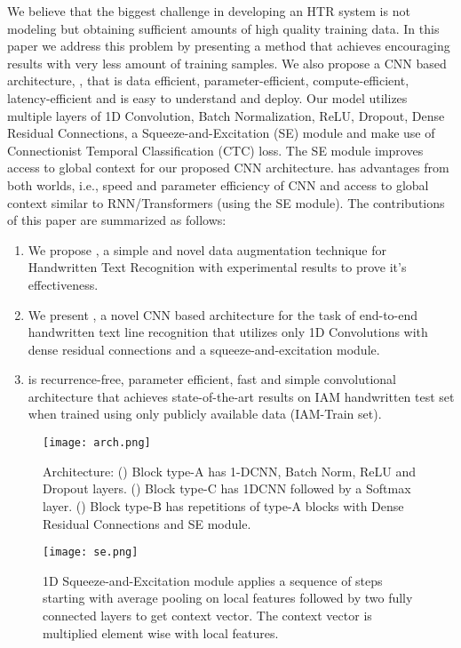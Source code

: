 \documentclass{article}
\begin{document}
We believe that the biggest challenge in developing an HTR system is not modeling but obtaining sufficient amounts of high quality training data. In this paper we address this problem by presenting a method that achieves encouraging results with very less amount of training samples. We also propose a CNN based architecture, ,  that is data efficient, parameter-efficient, compute-efficient, latency-efficient and is easy to understand and deploy. Our model utilizes multiple layers of 1D Convolution, Batch Normalization, ReLU, Dropout, Dense Residual Connections, a Squeeze-and-Excitation (SE)\cite{hu2018squeeze} module and make use of  Connectionist Temporal Classification (CTC) loss\cite{graves2006connectionist}. The SE module improves access to global context for our proposed CNN architecture.  has advantages from both worlds, i.e., speed and parameter efficiency of CNN and access to global context similar to RNN/Transformers (using the SE module).  
The contributions of this paper are summarized as follows:
\begin{enumerate}
\item We propose , a simple and novel data augmentation technique for Handwritten Text Recognition with experimental results to prove it's effectiveness.
\item We present , a novel CNN based architecture for the task of end-to-end handwritten text line recognition that utilizes only 1D Convolutions with dense residual connections and a squeeze-and-excitation module.
\item  is recurrence-free, parameter efficient, fast and simple convolutional architecture that achieves state-of-the-art results on IAM handwritten test set when trained using only publicly available data (IAM-Train set).
\end{enumerate}

\begin{figure}
  \centering
  \texttt{[image: arch.png]}
  \caption{ Architecture: () Block type-A has 1-DCNN, Batch Norm, ReLU and Dropout layers. () Block type-C has 1DCNN followed by a Softmax layer. () Block type-B has repetitions of type-A blocks with Dense Residual Connections and SE module.}
  \label{fig:arch}
\end{figure}


\begin{figure}
  \centering
  \texttt{[image: se.png]}
  \caption{1D Squeeze-and-Excitation module applies a sequence of steps starting with average pooling on local features followed by two fully connected layers to get context vector. The context vector is multiplied element wise with local features.}
\label{fig:se}
\end{figure}
\end{document}
